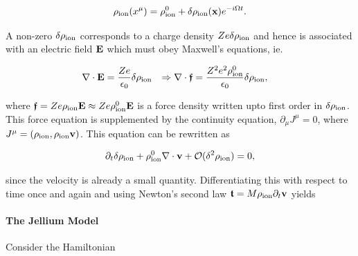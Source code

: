 \documentclass{homework}
\begin{document}
\begin{equation}
    \rho_{\textnormal{ion}}(x^\mu) = \rho^0_{\textnormal{ion}} + \delta \rho_{\textnormal{ion}} ({\bf x}) e^{-i\Omega t}.
\end{equation}

A non-zero $\delta \rho_{\textnormal{ion}}$ corresponds to a charge density $Z e \delta \rho_{\textnormal{ion}}$ and hence is associated with an electric field ${\bf E}$ which must obey Maxwell's equations, ie.

\begin{align}
    \nabla \cdot {\bf E} &= \frac{Ze}{\epsilon_0} \delta \rho_{\textnormal{ion}} & \Rightarrow  \nabla \cdot \bm{\mathfrak{f}} &= \frac{Z^2 e^2 \rho^0_{\textnormal{ion}} }{\epsilon_0} \delta \rho_{\textnormal{ion}},
\end{align}

where $\bm{\mathfrak{f}} = Z e \rho_{\textnormal{ion}} {\bf E} \approx Z e \rho^0_{\textnormal{ion}} {\bf E}$ is a force density written upto first order in $\delta \rho_{\textnormal{ion}}$. This force equation is supplemented by the continuity equation, $\partial_{\mu} J^\mu = 0$, where $J^\mu = (\rho_{\textnormal{ion}}, \rho_{\textnormal{ion}} {\bf v})$. This equation can be rewritten as 

$$
\partial_t \delta \rho_{\textnormal{ion}} +  \rho^0_{\textnormal{ion}} \nabla \cdot {\bf v} + \mathcal{O}(\delta^2 \rho_{\textnormal{ion}}) = 0,
$$

since the velocity is already a small quantity. Differentiating this with respect to time once and again and using Newton's second law $\bm{\mathfrak{t}} = M \rho_{\textnormal{ion}} \partial_t {\bf v}$ yields 
\fi

\paragraph{\textbf{The Jellium Model}}


Consider the Hamiltonian 
\end{document}
